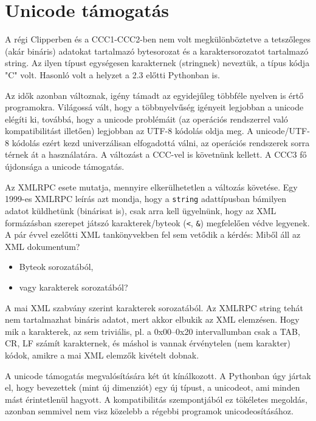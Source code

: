 


\section{Unicode támogatás}

A régi Clipperben és a CCC1-CCC2-ben nem volt megkülönböztetve
a tetszőleges (akár bináris) adatokat tartalmazó bytesorozat
és a karaktersorozatot tartalmazó string. Az ilyen típust egységesen 
karakternek (stringnek) neveztük, a típus kódja  "C" volt.
Hasonló volt a helyzet a 2.3 előtti Pythonban is.

Az idők azonban változnak, igény támadt az egyidejűleg
többféle nyelven is értő programokra. Világossá vált, hogy
a többnyelvűség igényeit legjobban a unicode elégíti ki,
továbbá, hogy a unicode problémáit (az operációs
rendszerrel való kompatibilitást illetően) legjobban
az UTF-8 kódolás oldja meg. A unicode/UTF-8 kódolás
ezért kezd univerzálisan elfogadottá válni, 
az operációs rendszerek sorra térnek át a használatára.
A változást a CCC-vel is követnünk kellett.
A CCC3 fő újdonsága a unicode támogatás.

Az XMLRPC esete mutatja, mennyire elkerülhetetlen a változás követése. 
Egy 1999-es XMLRPC leírás azt mondja, hogy a \verb!string!
adattípusban bámilyen adatot küldhetünk (binárisat is),
csak arra kell ügyelnünk, hogy az XML formázásban szerepet
játszó karakterek/byteok (\verb!<!, \verb!&!) megfelelően védve legyenek. 
A pár évvel ezelőtti XML tankönyvekben fel sem vetődik a kérdés:
Miből áll az XML dokumentum?
\begin{itemize}
\item Byteok sorozatából,
\item vagy karakterek sorozatából?
\end{itemize}
A mai XML szabvány szerint karakterek sorozatából.
Az XMLRPC string tehát nem tartalmazhat bináris adatot, 
mert akkor elbukik az XML elemzésen. Hogy mik a karakterek,
az sem triviális, pl. a 0x00--0x20 intervallumban csak a
TAB, CR, LF számít karakternek, és máshol is vannak érvénytelen
(nem karakter) kódok, amikre a mai XML elemzők kivételt dobnak.

A unicode támogatás megvalósítására két út kínálkozott.
A Pythonban úgy jártak el, hogy bevezettek (mint új dimenziót) 
egy új típust, a unicodeot, ami minden mást érintetlenül hagyott.
A kompatibilitás szempontjából ez tökéletes megoldás,
azonban semmivel nem visz közelebb a régebbi programok
unicodeosításához.

